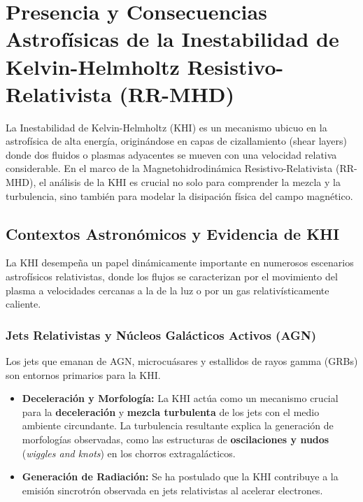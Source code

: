 
\section{Presencia y Consecuencias Astrofísicas de la Inestabilidad de Kelvin-Helmholtz Resistivo-Relativista (RR-MHD)}

La Inestabilidad de Kelvin-Helmholtz (KHI) es un mecanismo ubicuo en la astrofísica de alta energía, originándose en capas de cizallamiento (shear layers) donde dos fluidos o plasmas adyacentes se mueven con una velocidad relativa considerable. En el marco de la Magnetohidrodinámica Resistivo-Relativista (RR-MHD), el análisis de la KHI es crucial no solo para comprender la mezcla y la turbulencia, sino también para modelar la disipación física del campo magnético.

\subsection{Contextos Astronómicos y Evidencia de KHI}

La KHI desempeña un papel dinámicamente importante en numerosos escenarios astrofísicos relativistas, donde los flujos se caracterizan por el movimiento del plasma a velocidades cercanas a la de la luz o por un gas relativísticamente caliente.

\subsubsection{Jets Relativistas y Núcleos Galácticos Activos (AGN)}
Los jets que emanan de AGN, microcuásares y estallidos de rayos gamma (GRBs) son entornos primarios para la KHI.
\begin{itemize}
    \item \textbf{Deceleración y Morfología:} La KHI actúa como un mecanismo crucial para la \textbf{deceleración} y \textbf{mezcla turbulenta} de los jets con el medio ambiente circundante. La turbulencia resultante explica la generación de morfologías observadas, como las estructuras de \textbf{oscilaciones y nudos} (\textit{wiggles and knots}) en los chorros extragalácticos.
    \item \textbf{Generación de Radiación:} Se ha postulado que la KHI contribuye a la emisión sincrotrón observada en jets relativistas al acelerar electrones.
\end{itemize}

